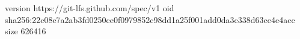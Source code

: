 version https://git-lfs.github.com/spec/v1
oid sha256:22c08e7a2ab3fd0250ce0f0979852c98dd1a25f001add0da3c338d63ce4e4acc
size 626416
